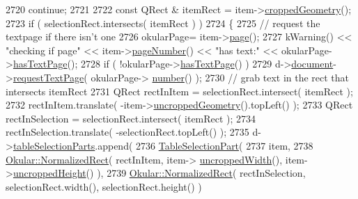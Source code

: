\begin{DoxyCode}
{{2720                         \textcolor{keywordflow}{continue};
2721 
2722                     \textcolor{keyword}{const} QRect & itemRect = item->\hyperlink{classPageViewItem_aa2c3e988ccbe9ee162b73d7f89ab0d02}{croppedGeometry}();
2723                     \textcolor{keywordflow}{if} ( selectionRect.intersects( itemRect ) )
2724                     \{
2725                         \textcolor{comment}{// request the textpage if there isn't one}
2726                         okularPage= item->\hyperlink{classPageViewItem_a5c512d95e5563e8d19d1fb3d93dafc31}{page}();
2727                         kWarning() << \textcolor{stringliteral}{"checking if page"} << item->\hyperlink{classPageViewItem_ad75aab4c1ffd842bd5d54c0cfe84d1bf}{pageNumber}() << \textcolor{stringliteral}{"has text:"} << 
      okularPage->\hyperlink{classOkular_1_1Page_a44163bc0e76204a9d9c42da442ee734a}{hasTextPage}();
2728                         \textcolor{keywordflow}{if} ( !okularPage->\hyperlink{classOkular_1_1Page_a44163bc0e76204a9d9c42da442ee734a}{hasTextPage}() )
2729                             d->\hyperlink{classPageViewPrivate_a50645b9853306cffd74e51efb677e5b4}{document}->\hyperlink{classOkular_1_1Document_ad4909d8411d3ad8faf716f30a6e9f417}{requestTextPage}( okularPage->
      \hyperlink{classOkular_1_1Page_a6eee5f157a130b47d81ddd63e501664b}{number}() );
2730                         \textcolor{comment}{// grab text in the rect that intersects itemRect}
2731                         QRect rectInItem = selectionRect.intersect( itemRect );
2732                         rectInItem.translate( -item->\hyperlink{classPageViewItem_a5d2e73a003f65b4e95c0c21b1698f835}{uncroppedGeometry}().topLeft() );
2733                         QRect rectInSelection = selectionRect.intersect( itemRect );
2734                         rectInSelection.translate( -selectionRect.topLeft() );
2735                         d->\hyperlink{classPageViewPrivate_aec476c0b74867740803d4ba34393b154}{tableSelectionParts}.append(
2736                             \hyperlink{structTableSelectionPart}{TableSelectionPart}(
2737                                 item,
2738                                 \hyperlink{classOkular_1_1NormalizedRect}{Okular::NormalizedRect}( rectInItem, item->
      \hyperlink{classPageViewItem_a240924407ae22bb0489363a6a2d481b9}{uncroppedWidth}(), item->\hyperlink{classPageViewItem_af1380fce5dc13a72458ef834c720b128}{uncroppedHeight}() ),
2739                                 \hyperlink{classOkular_1_1NormalizedRect}{Okular::NormalizedRect}( rectInSelection, 
      selectionRect.width(), selectionRect.height() )
}}
\end{DoxyCode}

